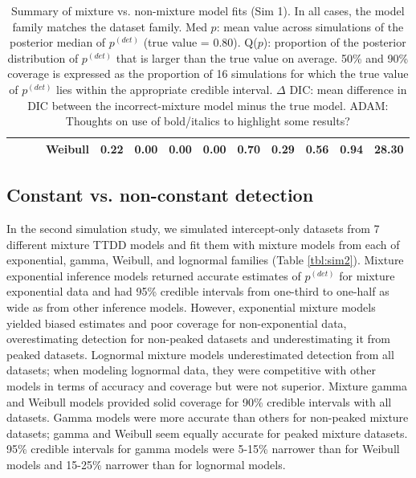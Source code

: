 \documentclass[useAMS,usenatbib,referee,12pt]{article}
\newcommand{\adam}[1]{{\color{blue} ADAM: #1}}
\begin{document}
\begin{table}[ht]
\begin{tabular}{l|l|l|l|cccc|cccc||c}
 & & &   Weibull & 0.22 & 0.00 & 0.00 & 0.00 & 0.70 & 0.29 & 0.56 & 0.94 & 28.30 \\ 
   \hline
\end{tabular}
\caption{\label{tbl:sim1} Summary of mixture vs. non-mixture model fits (Sim 1).  
In all cases, the model family matches the dataset family.  
Med $p$: mean value across simulations of the posterior median of $p^{(det)}$ (true value = 0.80).  
Q($p$): proportion of the posterior distribution of $p^{(det)}$ that is larger than the true value on average.  
50\% and 90\% coverage is expressed as the proportion of 16 simulations for which the true value of $p^{(det)}$ lies within the appropriate credible interval.  
$\Delta$ DIC: mean difference in DIC between the incorrect-mixture model minus the true model. \adam{Thoughts on use of bold/italics to highlight some results?}}
\end{table}

\subsection{Constant vs. non-constant detection}\label{sec:family}

In the second simulation study, we simulated intercept-only datasets from 7 different mixture TTDD models and fit them with mixture models from each of exponential, gamma, Weibull, and lognormal families (Table \ref{tbl:sim2}).  
Mixture exponential inference models returned accurate estimates of $p^{(det)}$ for mixture exponential data and had 95\% credible intervals from one-third to one-half as wide as from other inference models.  
However, exponential mixture models yielded biased estimates and poor coverage for non-exponential data, overestimating detection for non-peaked datasets and underestimating it from peaked datasets.  
Lognormal mixture models underestimated detection from all datasets; when modeling lognormal data, they were competitive with other models in terms of accuracy and coverage but were not superior.  
Mixture gamma and Weibull models provided solid coverage for 90\% credible intervals with all datasets.  
Gamma models were more accurate than others for non-peaked mixture datasets; gamma and Weibull seem equally accurate for peaked mixture datasets.  
95\% credible intervals for gamma models were 5-15\% narrower than for Weibull models and 15-25\% narrower than for lognormal models.
\end{document}
